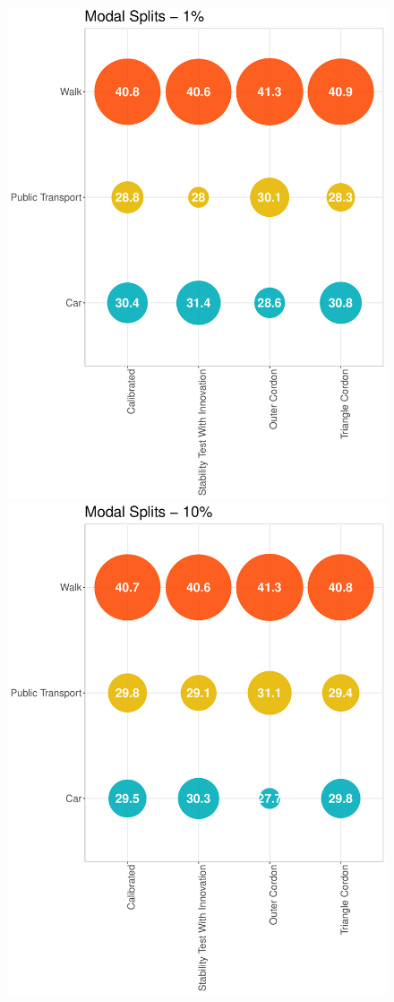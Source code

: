 \documentclass[Journal,letterpaper]{ascelike-new}
\begin{document}
\begin{figure}[h!]
	\centering
	\includegraphics[scale=0.38]{images/modal_split_1pct.pdf}\hspace{0cm}
	\includegraphics[scale=0.38]{images/modal_split_10pct.pdf}

\end{figure}
\end{document}
